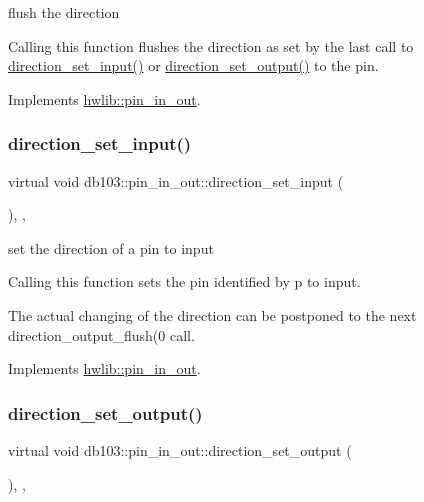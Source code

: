 flush the direction

Calling this function flushes the direction as set by the last call to \hyperlink{classdb103_1_1pin__in__out_af03a8c83335daf7c529a6a73fdfbf1b4}{direction\+\_\+set\+\_\+input()} or \hyperlink{classdb103_1_1pin__in__out_a55b94d79329ccbe2a263e954cccc1ba9}{direction\+\_\+set\+\_\+output()} to the pin. 

Implements \hyperlink{classhwlib_1_1pin__in__out_a86ef2b296683d8c0133280075c82cb51}{hwlib\+::pin\+\_\+in\+\_\+out}.

\mbox{\label{classdb103_1_1pin__in__out_af03a8c83335daf7c529a6a73fdfbf1b4}} 
\subsubsection{\texorpdfstring{direction\+\_\+set\+\_\+input()}{direction\_set\_input()}}
{\footnotesize\ttfamily virtual void db103\+::pin\+\_\+in\+\_\+out\+::direction\+\_\+set\+\_\+input (\begin{DoxyParamCaption}{ }\end{DoxyParamCaption})\hspace{0.3cm}{\ttfamily [inline]}, {\ttfamily [override]}, {\ttfamily [virtual]}}

set the direction of a pin to input

Calling this function sets the pin identified by p to input.

The actual changing of the direction can be postponed to the next direction\+\_\+output\+\_\+flush(0 call. 

Implements \hyperlink{classhwlib_1_1pin__in__out_a54ce1a5086d3c9e7b868511b1d46acd0}{hwlib\+::pin\+\_\+in\+\_\+out}.

\mbox{\label{classdb103_1_1pin__in__out_a55b94d79329ccbe2a263e954cccc1ba9}} 
\subsubsection{\texorpdfstring{direction\+\_\+set\+\_\+output()}{direction\_set\_output()}}
{\footnotesize\ttfamily virtual void db103\+::pin\+\_\+in\+\_\+out\+::direction\+\_\+set\+\_\+output (\begin{DoxyParamCaption}{ }\end{DoxyParamCaption})\hspace{0.3cm}{\ttfamily [inline]}, {\ttfamily [override]}, {\ttfamily [virtual]}}


